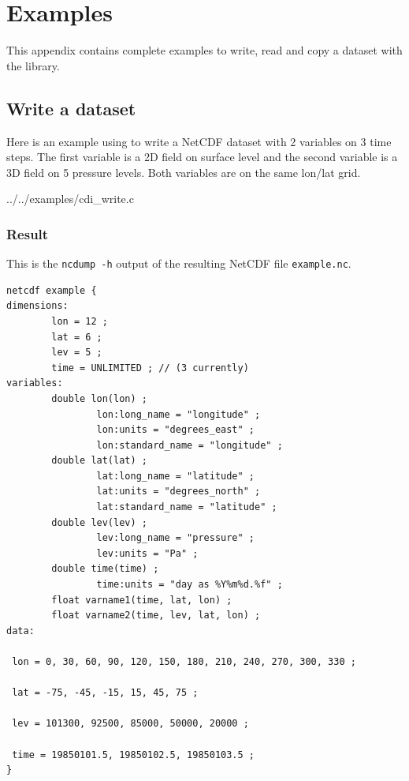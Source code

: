 
\chapter{\label{example}Examples}

This appendix contains complete examples to write, read
and copy a dataset with the {\CDI} library.


\section{\label{example_write}Write a dataset}

Here is an example using {\CDI} to write a NetCDF dataset with 
2 variables on 3 time steps. The first variable is a 2D field
on surface level and the second variable is a 3D field on 5 pressure
levels. Both variables are on the same lon/lat grid. 


{../../examples/cdi_write.c}


\subsection{Result}

This is the {\tt ncdump -h} output of the resulting NetCDF file {\tt example.nc}.

\begin{lstlisting}[]
netcdf example {
dimensions:
        lon = 12 ;
        lat = 6 ;
        lev = 5 ;
        time = UNLIMITED ; // (3 currently)
variables:
        double lon(lon) ;
                lon:long_name = "longitude" ;
                lon:units = "degrees_east" ;
                lon:standard_name = "longitude" ;
        double lat(lat) ;
                lat:long_name = "latitude" ;
                lat:units = "degrees_north" ;
                lat:standard_name = "latitude" ;
        double lev(lev) ;
                lev:long_name = "pressure" ;
                lev:units = "Pa" ;
        double time(time) ;
                time:units = "day as %Y%m%d.%f" ;
        float varname1(time, lat, lon) ;
        float varname2(time, lev, lat, lon) ;
data:

 lon = 0, 30, 60, 90, 120, 150, 180, 210, 240, 270, 300, 330 ;

 lat = -75, -45, -15, 15, 45, 75 ;

 lev = 101300, 92500, 85000, 50000, 20000 ;

 time = 19850101.5, 19850102.5, 19850103.5 ;
}
\end{lstlisting}



